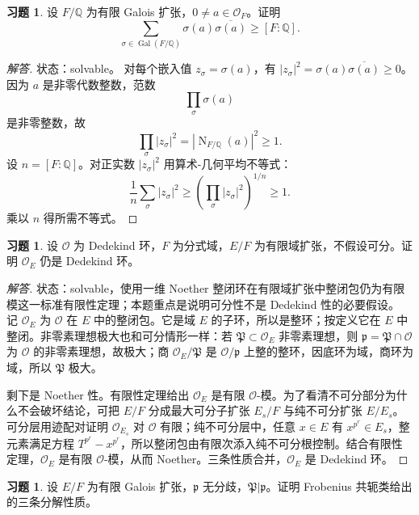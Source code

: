 \documentclass[11pt,a4paper,openany]{ctexbook}
\numberwithin{equation}{chapter}
\newcommand{\Q}{\mathbb{Q}}
\newcommand{\OF}{\mathcal{O}_F}
\newcommand{\Gal}{\operatorname{Gal}}
\newcommand{\Nm}{\operatorname{N}}
\theoremstyle{plain}
\theoremstyle{definition}
\newtheorem{exercise}[theorem]{习题}
\theoremstyle{remark}
\begin{document}
\begin{exercise}
设 $F/\Q$ 为有限 Galois 扩张，$0\ne a\in\OF$。证明
\[
\sum_{\sigma\in\Gal(F/\Q)}\sigma(a)\overline{\sigma(a)}\ge [F:\Q].
\]
\end{exercise}

\begin{proof}[解答]
状态：solvable。
对每个嵌入值 $z_\sigma=\sigma(a)$，有 $|z_\sigma|^2=\sigma(a)\overline{\sigma(a)}\ge0$。因为 $a$ 是非零代数整数，范数
\[
\prod_\sigma \sigma(a)
\]
是非零整数，故
\[
\prod_\sigma |z_\sigma|^2=|\Nm_{F/\Q}(a)|^2\ge1.
\]
设 $n=[F:\Q]$。对正实数 $|z_\sigma|^2$ 用算术-几何平均不等式：
\[
\frac1n\sum_\sigma |z_\sigma|^2
\ge
\left(\prod_\sigma |z_\sigma|^2\right)^{1/n}
\ge1.
\]
乘以 $n$ 得所需不等式。
\end{proof}

\begin{exercise}
设 $\mathcal O$ 为 Dedekind 环，$F$ 为分式域，$E/F$ 为有限域扩张，不假设可分。证明 $\mathcal O_E$ 仍是 Dedekind 环。
\end{exercise}

\begin{proof}[解答]
状态：solvable，使用一维 Noether 整闭环在有限域扩张中整闭包仍为有限模这一标准有限性定理；本题重点是说明可分性不是 Dedekind 性的必要假设。
记 $\mathcal O_E$ 为 $\mathcal O$ 在 $E$ 中的整闭包。它是域 $E$ 的子环，所以是整环；按定义它在 $E$ 中整闭。非零素理想极大也和可分情形一样：若 $\mathfrak P\subset\mathcal O_E$ 非零素理想，则 $\mathfrak p=\mathfrak P\cap\mathcal O$ 为 $\mathcal O$ 的非零素理想，故极大；商 $\mathcal O_E/\mathfrak P$ 是 $\mathcal O/\mathfrak p$ 上整的整环，因底环为域，商环为域，所以 $\mathfrak P$ 极大。

剩下是 Noether 性。有限性定理给出 $\mathcal O_E$ 是有限 $\mathcal O$-模。为了看清不可分部分为什么不会破坏结论，可把 $E/F$ 分成最大可分子扩张
$E_s/F$ 与纯不可分扩张 $E/E_s$。可分层用迹配对证明
$\mathcal O_{E_s}$ 对 $\mathcal O$ 有限；纯不可分层中，任意 $x\in E$ 有
$x^{p^r}\in E_s$，整元素满足方程 $T^{p^r}-x^{p^r}$，所以整闭包由有限次添入纯不可分根控制。结合有限性定理，$\mathcal O_E$ 是有限
$\mathcal O$-模，从而 Noether。三条性质合并，$\mathcal O_E$ 是 Dedekind 环。
\end{proof}

\begin{exercise}
设 $E/F$ 为有限 Galois 扩张，$\mathfrak p$ 无分歧，$\mathfrak P|\mathfrak p$。证明 Frobenius 共轭类给出的三条分解性质。
\end{exercise}
\end{document}
